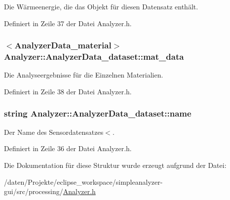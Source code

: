 Die Wärmeenergie, die das Objekt für diesen Datensatz enthält. 



Definiert in Zeile 37 der Datei Analyzer.\-h.

\hypertarget{structAnalyzer_1_1AnalyzerData__dataset_a25d0189c93bc0da58f778750edb2a2b9}{
\subsubsection[{mat\-\_\-data}]{$<${\bf Analyzer\-Data\-\_\-material}$>$ Analyzer\-::\-Analyzer\-Data\-\_\-dataset\-::mat\-\_\-data}}\label{structAnalyzer_1_1AnalyzerData__dataset_a25d0189c93bc0da58f778750edb2a2b9}


Die Analyseergebnisse für die Einzelnen Materialien. 



Definiert in Zeile 38 der Datei Analyzer.\-h.

\hypertarget{structAnalyzer_1_1AnalyzerData__dataset_a53f3c1896123de4dc00f01e593d5f70d}{
\subsubsection[{name}]{\setlength{\rightskip}{0pt plus 5cm}string Analyzer\-::\-Analyzer\-Data\-\_\-dataset\-::name}}\label{structAnalyzer_1_1AnalyzerData__dataset_a53f3c1896123de4dc00f01e593d5f70d}


Der Name des Sensordatensatzes$<$. 



Definiert in Zeile 36 der Datei Analyzer.\-h.



Die Dokumentation für diese Struktur wurde erzeugt aufgrund der Datei\-:\begin{DoxyCompactItemize}
\item 
/daten/\-Projekte/eclipse\-\_\-workspace/simpleanalyzer-\/gui/src/processing/\hyperlink{Analyzer_8h}{Analyzer.\-h}\end{DoxyCompactItemize}
